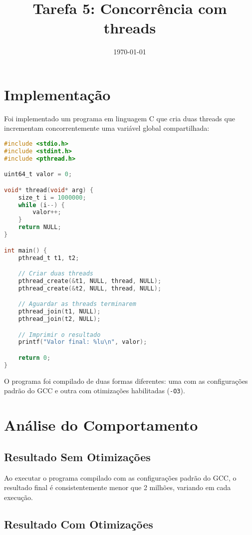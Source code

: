 \documentclass[12pt]{article}
\title{Tarefa 5: Concorrência com threads}
\author{}
\date{\today}
\begin{document}
\maketitle

\section{Implementação}

Foi implementado um programa em linguagem C que cria duas threads que incrementam concorrentemente uma variável global compartilhada:

\begin{lstlisting}[language=C]
#include <stdio.h>
#include <stdint.h>
#include <pthread.h>

uint64_t valor = 0;

void* thread(void* arg) {
    size_t i = 1000000;
    while (i--) {
        valor++;
    }
    return NULL;
}

int main() {
    pthread_t t1, t2;

    // Criar duas threads
    pthread_create(&t1, NULL, thread, NULL);
    pthread_create(&t2, NULL, thread, NULL);

    // Aguardar as threads terminarem
    pthread_join(t1, NULL);
    pthread_join(t2, NULL);

    // Imprimir o resultado
    printf("Valor final: %lu\n", valor);

    return 0;
}
\end{lstlisting}

O programa foi compilado de duas formas diferentes: uma com as configurações padrão do GCC e outra com otimizações habilitadas (\texttt{-O3}).

\section{Análise do Comportamento}

\subsection{Resultado Sem Otimizações}

Ao executar o programa compilado com as configurações padrão do GCC, o resultado final é consistentemente menor que 2 milhões, variando em cada execução.

\subsection{Resultado Com Otimizações}
\end{document}
